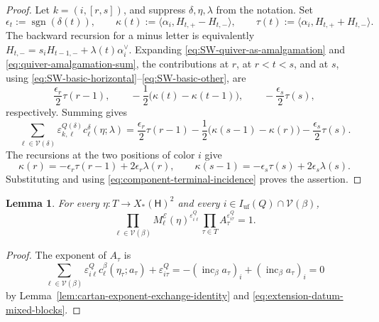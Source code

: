 \documentclass[10pt,a4paper]{article}
\newtheorem{lemma}[theorem]{Lemma}
\theoremstyle{definition}
\theoremstyle{remark}
\newcommand{\torusH}{\mathsf{H}}
\newcommand{\Vcal}{\mathcal V}
\newcommand{\eps}{\varepsilon}
\begin{document}
\begin{proof}
Let \(k=(i,[r,s])\), and suppress \(\delta,\eta,\lambda\) from the
notation.  Set
\[
 \epsilon_t:=\operatorname{sgn}(\delta(t)),\qquad
 \kappa(t):=\langle\alpha_i,H_{t,+}-H_{t,-}\rangle,\qquad
 \tau(t):=\langle\alpha_i,H_{t,+}+H_{t,-}\rangle.
\]
The backward recursion for a minus letter is equivalently
\(H_{t,-}=s_iH_{t-1,-}+\lambda(t)\alpha_i^\vee\).  Expanding
\eqref{eq:SW-quiver-as-amalgamation} and
\eqref{eq:quiver-amalgamation-sum}, the contributions at \(r\), at
\(r<t<s\), and at \(s\), using
\eqref{eq:SW-basic-horizontal}--\eqref{eq:SW-basic-other}, are
\[
 \frac{\epsilon_r}{2}\tau(r-1),\qquad
 -\frac12\bigl(\kappa(t)-\kappa(t-1)\bigr),\qquad
 -\frac{\epsilon_s}{2}\tau(s),
\]
respectively.  Summing gives
\[
 \sum_{\ell\in\Vcal(\delta)}
 \eps^{Q(\delta)}_{k,\ell}c_\ell^\delta(\eta;\lambda)
 =\frac{\epsilon_r}{2}\tau(r-1)
  -\frac12\bigl(\kappa(s-1)-\kappa(r)\bigr)
  -\frac{\epsilon_s}{2}\tau(s).
\]
The recursions at the two positions of color \(i\) give
\[
 \kappa(r)=-\epsilon_r\tau(r-1)+2\epsilon_r\lambda(r),
 \qquad
 \kappa(s-1)=-\epsilon_s\tau(s)+2\epsilon_s\lambda(s).
\]
Substituting and using \eqref{eq:component-terminal-incidence} proves the
assertion.
\end{proof}

\begin{lemma}
\label{lem:cartan-correction-exchange-homogeneity}
For every \(\eta:T\to X_*(\torusH)^2\) and every
\(i\in I_{\mathrm{uf}}(Q)\cap\Vcal(\beta)\),
\begin{equation}
 \prod_{\ell\in\Vcal(\beta)}
 M_\ell^{\mathcal E}(\eta)^{\eps^Q_{i\ell}}
 \prod_{\tau\in T}A_\tau^{\eps^Q_{i\tau}}=1.
 \label{eq:component-cartan-monomial-identity}
\end{equation}
\end{lemma}

\begin{proof}
The exponent of \(A_\tau\) is
\[
 \sum_{\ell\in\Vcal(\beta)}
 \eps^Q_{i\ell}c_\ell^{\beta}(\eta_\tau;a_\tau)+\eps^Q_{i\tau}
 =-(\operatorname{inc}_\beta a_\tau)_i
  +(\operatorname{inc}_\beta a_\tau)_i=0
\]
by Lemma~\ref{lem:cartan-exponent-exchange-identity} and
\eqref{eq:extension-datum-mixed-blocks}.
\end{proof}
\end{document}
